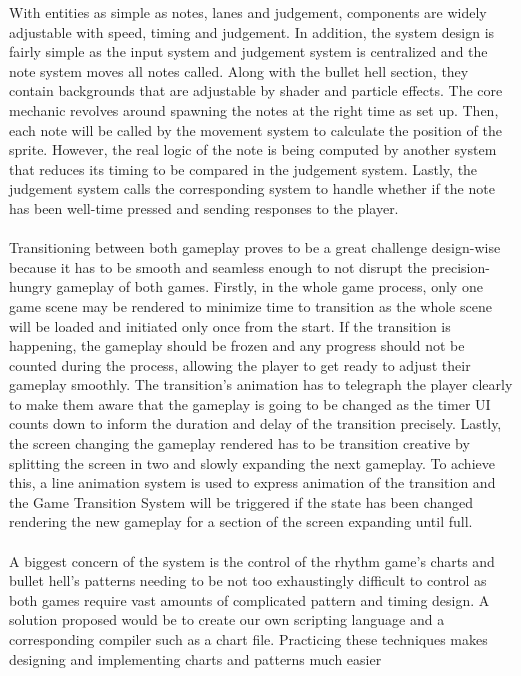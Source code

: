 With entities as simple as notes, lanes and judgement, components are widely adjustable with speed, timing and judgement.
In addition, the system design is fairly simple as the input system and judgement system is centralized and the note system moves all notes called.
Along with the bullet hell section, they contain backgrounds that are adjustable by shader and particle effects.
The core mechanic revolves around spawning the notes at the right time as set up.
Then, each note will be called by the movement system to calculate the position of the sprite.
However, the real logic of the note is being computed by another system that reduces its timing to be compared in the judgement system.
Lastly, the judgement system calls the corresponding system to handle whether if the note has been well-time pressed and sending responses to the player.
\\\\
Transitioning between both gameplay proves to be a great challenge design-wise
because it has to be smooth and seamless enough to not disrupt the precision-hungry gameplay of both games.
Firstly, in the whole game process, only one game scene may be rendered to minimize time to transition
as the whole scene will be loaded and initiated only once from the start.
If the transition is happening, the gameplay should be frozen and any progress should not be counted during the process,
allowing the player to get ready to adjust their gameplay smoothly.
The transition's animation has to telegraph the player clearly to make them aware that the gameplay is going to be changed
as the timer UI counts down to inform the duration and delay of the transition precisely.
Lastly, the screen changing the gameplay rendered has to be transition creative by splitting the screen in two and slowly expanding the next gameplay.
To achieve this, a line animation system is used to express animation of the transition
and the Game Transition System will be triggered if the state has been changed rendering the new gameplay for a section of the screen expanding until full.
\\\\
A biggest concern of the system is the control of the rhythm game’s charts and bullet hell’s patterns
needing to be not too exhaustingly difficult to control as both games require vast amounts of complicated pattern and timing design.
A solution proposed would be to create our own scripting language and a corresponding compiler such as a chart file.
Practicing these techniques makes designing and implementing charts and patterns much easier
